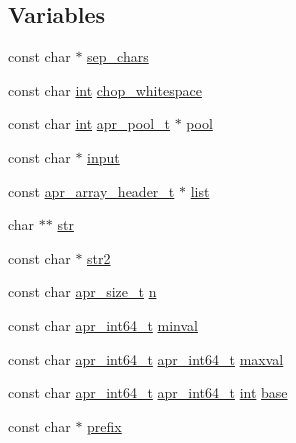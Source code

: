 \subsection*{Variables}
\begin{DoxyCompactItemize}
\item 
const char $\ast$ \hyperlink{group__apr__cstr_gaac776dabd7e104429f99832212b1ce86}{sep\+\_\+chars}
\item 
const char \hyperlink{pcre_8txt_a42dfa4ff673c82d8efe7144098fbc198}{int} \hyperlink{group__apr__cstr_ga083d5d593a9e3048760ca3629d75b66b}{chop\+\_\+whitespace}
\item 
const char \hyperlink{pcre_8txt_a42dfa4ff673c82d8efe7144098fbc198}{int} \hyperlink{structapr__pool__t}{apr\+\_\+pool\+\_\+t} $\ast$ \hyperlink{group__apr__cstr_gaffd2c3a5e2df82a9547aa2afb6d98059}{pool}
\item 
const char $\ast$ \hyperlink{group__apr__cstr_ga9adc11d527cdd7b029b0d2ccd910ff3b}{input}
\item 
const \hyperlink{structapr__array__header__t}{apr\+\_\+array\+\_\+header\+\_\+t} $\ast$ \hyperlink{group__apr__cstr_ga5831758abcb3fed3345ba11ace93e2e6}{list}
\item 
char $\ast$$\ast$ \hyperlink{group__apr__cstr_gaf25d6dc49269fa2003ac7c7fa6f13915}{str}
\item 
const char $\ast$ \hyperlink{group__apr__cstr_ga9038779e993a8f57bea86bf3d70b804e}{str2}
\item 
const char \hyperlink{group__apr__platform_gaaa72b2253f6f3032cefea5712a27540e}{apr\+\_\+size\+\_\+t} \hyperlink{group__apr__cstr_gabfc835ba1bb93aeecef9b949481c4a2d}{n}
\item 
const char \hyperlink{group__apr__platform_ga4b75afbf973dc6c8aea4ae75b044aa08}{apr\+\_\+int64\+\_\+t} \hyperlink{group__apr__cstr_gaa335fb12147c68c56f2ad7eb44a1e5d9}{minval}
\item 
const char \hyperlink{group__apr__platform_ga4b75afbf973dc6c8aea4ae75b044aa08}{apr\+\_\+int64\+\_\+t} \hyperlink{group__apr__platform_ga4b75afbf973dc6c8aea4ae75b044aa08}{apr\+\_\+int64\+\_\+t} \hyperlink{group__apr__cstr_gab204ae73d519f09edf203b4f8e7a4f36}{maxval}
\item 
const char \hyperlink{group__apr__platform_ga4b75afbf973dc6c8aea4ae75b044aa08}{apr\+\_\+int64\+\_\+t} \hyperlink{group__apr__platform_ga4b75afbf973dc6c8aea4ae75b044aa08}{apr\+\_\+int64\+\_\+t} \hyperlink{pcre_8txt_a42dfa4ff673c82d8efe7144098fbc198}{int} \hyperlink{group__apr__cstr_ga9694bf2ef28fab07efa8dd44bcaec5a5}{base}
\item 
const char $\ast$ \hyperlink{group__apr__cstr_ga5b41c5ae4505891e6c53e26df197e02b}{prefix}
\end{DoxyCompactItemize}


